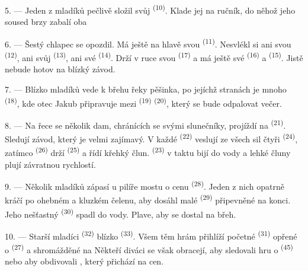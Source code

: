 5. --- Jeden z mladíků pečlivě složil svůj  \textsuperscript{(10)}.
Klade jej na ručník, do něhož jeho soused brzy zabalí oba 

6. --- Šestý chlapec se opozdil. Má ještě na hlavě svou 
\textsuperscript{(11)}. Nesvlékl si ani svou  \textsuperscript{(12)},
ani svůj  \textsuperscript{(13)}, ani své 
\textsuperscript{(14)}. Drží v ruce svou  \textsuperscript{(17)} a má
ještě své  \textsuperscript{(16)} a 
\textsuperscript{(15)}. Jistě nebude hotov na blízký závod.

7. --- Blízko mladíků vede k břehu řeky pěšinka, po jejíchž stranách je mnoho
 \textsuperscript{(18)}, kde otec Jakub připravuje mezi 
\textsuperscript{(19)}  \textsuperscript{(20)}, který se bude
odpalovat večer.

\VUsaut{4.4mm}
\VUsaut{3.4mm}

8. --- Na řece se několik dam, chránících se svými slunečníky, projíždí na
 \textsuperscript{(21)}. Sledují závod, který je velmi zajímavý. V každé
 \textsuperscript{(22)} veslují ze všech sil čtyři 
\textsuperscript{(24)}, zatímco  \textsuperscript{(26)} drží
 \textsuperscript{(25)} a řídí křehký člun. 
\textsuperscript{(23)} v taktu bijí do vody a lehké čluny plují závratnou rychlostí.

9. --- Několik mladíků zápasí u pilíře mostu o cenu 
\textsuperscript{(28)}. Jeden z nich opatrně kráčí po ohebném a kluzkém čelenu, aby
dosáhl malé  \textsuperscript{(29)} připevněné na konci. Jeho
nešťastný  \textsuperscript{(30)} spadl do vody. Plave, aby se dostal na
břeh.

10. --- Starší mladíci  \textsuperscript{(32)} blízko
 \textsuperscript{(33)}. Všem těm hrám přihlíží početné
 \textsuperscript{(31)} opřené o 
 \textsuperscript{(27)} a shromážděné na  Někteří diváci
se však obracejí, aby sledovali hru o 
\textsuperscript{(45)} nebo aby obdivovali , který přichází na
 cen.

